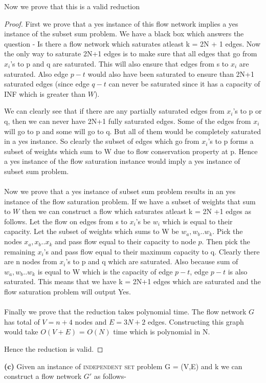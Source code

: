 \documentclass[11pt]{article}
\begin{document}
Now we prove that this is a valid reduction
\begin{proof}
First we prove that a yes instance of this flow network implies a yes instance of the subset sum problem. We have a black box which answers the question - Is there a flow network which saturates atleast k = 2N + 1 edges. Now the only way to saturate 2N+1 edges is to make sure that all edges that go from $x_i$'s to p and q are saturated. This will also ensure that edges from s to $x_i$ are saturated. Also edge $p-t$ would also have been saturated to ensure than 2N+1 saturated edges (since edge $q-t$ can never be saturated since it has a capacity of INF which is greater than $W$).

We can clearly see that if there are any partially saturated edges from $x_i$'s to p or q, then we can never have 2N+1 fully saturated edges. Some of the edges from $x_i$ will go to p and some will go to q. But all of them would be completely saturated in a yes instance. So clearly the subset of edges which go from $x_i$'s to p forms a subset of weights which sum to W due to flow conservation property at p. Hence a yes instance of the flow saturation instance would imply a yes instance of subset sum problem.\\\\
Now we prove that a yes instance of subset sum problem results in an yes instance of the flow saturation problem. If we have a subset of weights that sum to $W$ then we can construct a flow which saturates atleast k  = 2N +1 edges as follows. Let the flow on edges from s to $x_i$'s be $w_i$ which is equal to their capacity. Let the subset of weights which sums to W be $w_a, w_b .. w_k$. Pick the nodes $x_a, x_b .. x_k$ and pass flow equal to their capacity to node $p$. Then pick the remaining $x_i$'s and pass flow equal to their maximum capacity to q. Clearly there are n nodes from $x_i$'s to p and q which are saturated. Also because sum of $w_a, w_b .. w_k$ is equal to W which is the capacity of edge $p-t$, edge $p-t$ is also saturated. This means that we have k = 2N+1 edges which are saturated and the flow saturation problem will output Yes.\\\\
Finally we prove that the reduction takes polynomial time. The flow network $G$ has total of $V = n+4$ nodes and $E = 3N+2$ edges. Constructing this graph would take $O(V + E)$ = $O(N)$ time which is polynomial in N.

Hence the reduction is valid.
\end{proof}
\newpage
\textbf{(c)}
Given an instance  of \textsc{independent set} problem G = (V,E) and k we can construct a flow network $G'$ as follows- 
\end{document}
